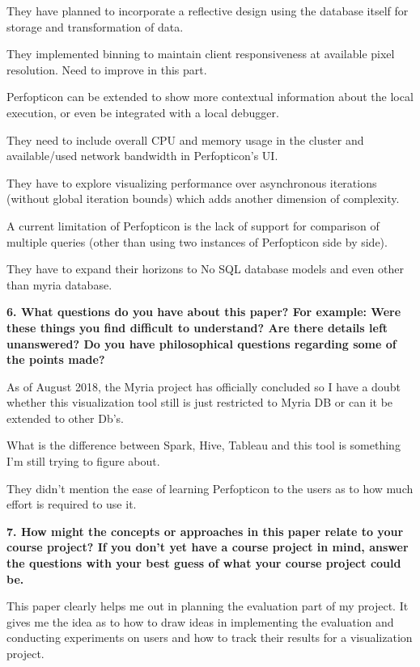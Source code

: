 \documentclass{article}[12pt]
\begin{document}
{
    They have planned to incorporate a reflective design using the database itself for storage and transformation of data.

    They implemented binning to maintain client responsiveness at available pixel resolution. Need to improve in this part.


    Perfopticon can be extended to show more contextual information about the local execution, or even be integrated with a local debugger. 

    They need to include overall CPU and memory usage in the cluster and available/used network bandwidth in Perfopticon’s UI.

    They have to explore visualizing performance over asynchronous iterations (without global iteration bounds) which adds another dimension of complexity. 

    A current limitation of Perfopticon is the lack of support for comparison of multiple queries (other than using two instances of Perfopticon side by side). 
   
    They have to expand their horizons to No SQL database models and even other than myria database.
}



\vspace{2ex}\noindent
{\bf 6. What questions do you have about this paper? For example: Were these things you find difficult to understand? Are there details left unanswered? Do you have philosophical questions regarding some of the points made? }

{
    As of August 2018, the Myria project has officially concluded so I have a doubt whether this visualization tool still is just restricted to Myria DB or can it be extended to other Db's.
    
    What is the difference between Spark, Hive, Tableau and this tool is something I'm still trying to figure about.
    
    They didn't mention the ease of learning Perfopticon to the users as to how much effort is required to use it.

}



\vspace{2ex}\noindent
{\bf 7. How might the concepts or approaches in this paper relate to your course project? If you don't yet have a course project in mind, answer the questions with your best guess of what your course project could be. }

{
    This paper clearly helps me out in planning the evaluation part of my project. It gives me the idea as to how to draw ideas in implementing the evaluation and conducting experiments on users and how to track their results for a visualization project.

}
\end{document}
